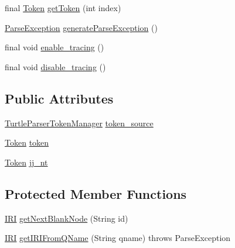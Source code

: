\begin{DoxyCompactItemize}
\item 
final \hyperlink{classuk_1_1ac_1_1manchester_1_1cs_1_1owl_1_1owlapi_1_1turtle_1_1parser_1_1_token}{Token} \hyperlink{classuk_1_1ac_1_1manchester_1_1cs_1_1owl_1_1owlapi_1_1turtle_1_1parser_1_1_turtle_parser_a18d9801f0f2b6947fa80fe000a2f056a}{get\-Token} (int index)
\item 
\hyperlink{classuk_1_1ac_1_1manchester_1_1cs_1_1owl_1_1owlapi_1_1turtle_1_1parser_1_1_parse_exception}{Parse\-Exception} \hyperlink{classuk_1_1ac_1_1manchester_1_1cs_1_1owl_1_1owlapi_1_1turtle_1_1parser_1_1_turtle_parser_a386f480f24d024157eb9ea7ef752edcc}{generate\-Parse\-Exception} ()
\item 
final void \hyperlink{classuk_1_1ac_1_1manchester_1_1cs_1_1owl_1_1owlapi_1_1turtle_1_1parser_1_1_turtle_parser_ad28d40e659547828e845fe8349bad746}{enable\-\_\-tracing} ()
\item 
final void \hyperlink{classuk_1_1ac_1_1manchester_1_1cs_1_1owl_1_1owlapi_1_1turtle_1_1parser_1_1_turtle_parser_a2b60e5a5f71119ff90c82996c9de93e3}{disable\-\_\-tracing} ()
\end{DoxyCompactItemize}
\subsection*{Public Attributes}
\begin{DoxyCompactItemize}
\item 
\hyperlink{classuk_1_1ac_1_1manchester_1_1cs_1_1owl_1_1owlapi_1_1turtle_1_1parser_1_1_turtle_parser_token_manager}{Turtle\-Parser\-Token\-Manager} \hyperlink{classuk_1_1ac_1_1manchester_1_1cs_1_1owl_1_1owlapi_1_1turtle_1_1parser_1_1_turtle_parser_a7ea2c85336529462b02c99210d094ecb}{token\-\_\-source}
\item 
\hyperlink{classuk_1_1ac_1_1manchester_1_1cs_1_1owl_1_1owlapi_1_1turtle_1_1parser_1_1_token}{Token} \hyperlink{classuk_1_1ac_1_1manchester_1_1cs_1_1owl_1_1owlapi_1_1turtle_1_1parser_1_1_turtle_parser_a0d524d582590becd8514824f25cbd2c7}{token}
\item 
\hyperlink{classuk_1_1ac_1_1manchester_1_1cs_1_1owl_1_1owlapi_1_1turtle_1_1parser_1_1_token}{Token} \hyperlink{classuk_1_1ac_1_1manchester_1_1cs_1_1owl_1_1owlapi_1_1turtle_1_1parser_1_1_turtle_parser_a8eb21d816d11c1a0a8a974150e161e9e}{jj\-\_\-nt}
\end{DoxyCompactItemize}
\subsection*{Protected Member Functions}
\begin{DoxyCompactItemize}
\item 
\hyperlink{classorg_1_1semanticweb_1_1owlapi_1_1model_1_1_i_r_i}{I\-R\-I} \hyperlink{classuk_1_1ac_1_1manchester_1_1cs_1_1owl_1_1owlapi_1_1turtle_1_1parser_1_1_turtle_parser_a47eb5573a02733a738774197bf464288}{get\-Next\-Blank\-Node} (String id)
\item 
\hyperlink{classorg_1_1semanticweb_1_1owlapi_1_1model_1_1_i_r_i}{I\-R\-I} \hyperlink{classuk_1_1ac_1_1manchester_1_1cs_1_1owl_1_1owlapi_1_1turtle_1_1parser_1_1_turtle_parser_af5e038aab240b1cb3d69d779d3644836}{get\-I\-R\-I\-From\-Q\-Name} (String qname)  throws Parse\-Exception 
\end{DoxyCompactItemize}

